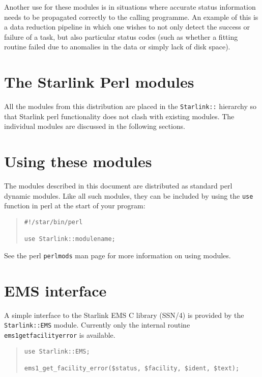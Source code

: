\documentclass[twoside,11pt]{article}
\newenvironment{myquote}{\begin{quote}\begin{small}}{\end{small}\end{quote}}
\newcommand{\xref}[3]{#1}
\renewcommand{\_}{\texttt{\symbol{95}}}
\begin{document}
Another use for these modules is in situations where accurate status
information needs to be propagated correctly to the calling
programme. An example of this is a data reduction pipeline in which
one wishes to not only detect the success or failure of a task, but
also particular status codes (such as whether a fitting routine failed
due to anomalies in the data or simply lack of disk space).


\section{The Starlink Perl modules}

All the modules from this distribution are placed in the \texttt{Starlink::}
hierarchy so that Starlink perl functionality does not clash with existing
modules.  The individual modules are discussed in the following sections.

\section{Using these modules}

The modules described in this document are distributed as standard
perl dynamic modules. Like all such modules, they can be included by
using the \texttt{use} function in perl at the start of your program:

\begin{myquote}
\begin{verbatim}
#!/star/bin/perl

use Starlink::modulename;
\end{verbatim}
\end{myquote}

See the perl \texttt{perlmods} man page for more information on using modules.


\section{EMS interface}

A simple interface to the Starlink EMS C library (\xref{SSN/4}{ssn4}{}) is
provided by the \texttt{Starlink::EMS} module. Currently only the internal
routine \texttt{ems1\_get\_facility\_error} is available.

\begin{myquote}
\begin{verbatim}
use Starlink::EMS;

ems1_get_facility_error($status, $facility, $ident, $text);
\end{verbatim}
\end{myquote}
\end{document}
